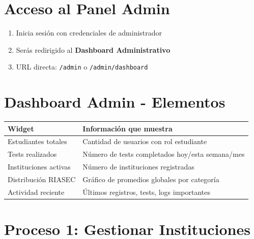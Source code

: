 \documentclass[12pt, a4paper]{report}
\begin{document}
\section{Acceso al Panel Admin}
\begin{enumerate}
    \item Inicia sesión con credenciales de administrador
    \item Serás redirigido al \textbf{Dashboard Administrativo}
    \item URL directa: \texttt{/admin} o \texttt{/admin/dashboard}
\end{enumerate}

\section{Dashboard Admin - Elementos}
\begin{table}[htbp]
\centering
\begin{tabularx}{\textwidth}{|l|X|}
\hline
\textbf{Widget} & \textbf{Información que muestra} \\
\hline
Estudiantes totales & Cantidad de usuarios con rol estudiante \\
\hline
Tests realizados & Número de tests completados hoy/esta semana/mes \\
\hline
Instituciones activas & Número de instituciones registradas \\
\hline
Distribución RIASEC & Gráfico de promedios globales por categoría \\
\hline
Actividad reciente & Últimos registros, tests, logs importantes \\
\hline
\end{tabularx}
\end{table}

\section{Proceso 1: Gestionar Instituciones}
\end{document}
